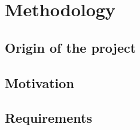 
\chapter{Methodology}


\section{Origin of the project}



\section{Motivation}


\section{Requirements}

